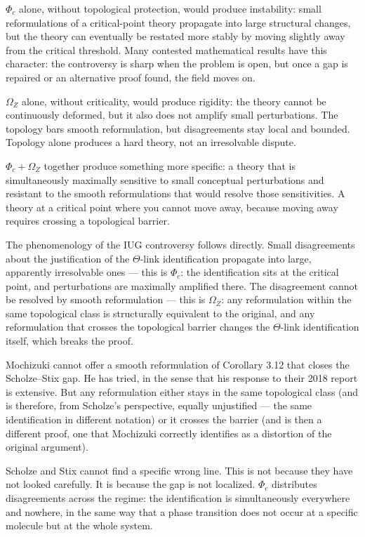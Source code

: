 \documentclass[10pt,a4paper]{article}
\begin{document}
$\Phi_c$ alone, without topological protection, would produce instability:
small reformulations of a critical-point theory propagate into large structural changes,
but the theory can eventually be restated more stably by moving slightly away from the critical
threshold.
Many contested mathematical results have this character: the controversy is sharp when the
problem is open, but once a gap is repaired or an alternative proof found, the field moves on.

$\Omega_Z$ alone, without criticality, would produce rigidity:
the theory cannot be continuously deformed, but it also does not amplify small perturbations.
The topology bars smooth reformulation, but disagreements stay local and bounded.
Topology alone produces a hard theory, not an irresolvable dispute.

$\Phi_c + \Omega_Z$ together produce something more specific:
a theory that is simultaneously maximally sensitive to small conceptual perturbations
and resistant to the smooth reformulations that would resolve those sensitivities.
A theory at a critical point where you cannot move away, because moving away requires
crossing a topological barrier.

The phenomenology of the IUG controversy follows directly.
Small disagreements about the justification of the $\Theta$-link identification propagate
into large, apparently irresolvable ones --- this is $\Phi_c$:
the identification sits at the critical point, and perturbations are maximally amplified there.
The disagreement cannot be resolved by smooth reformulation --- this is $\Omega_Z$:
any reformulation within the same topological class is structurally equivalent to the original,
and any reformulation that crosses the topological barrier changes the $\Theta$-link
identification itself, which breaks the proof.

Mochizuki cannot offer a smooth reformulation of Corollary 3.12 that closes the
Scholze--Stix gap.
He has tried, in the sense that his response to their 2018 report is extensive.
But any reformulation either stays in the same topological class (and is therefore,
from Scholze's perspective, equally unjustified --- the same identification in different
notation) or it crosses the barrier (and is then a different proof, one that Mochizuki
correctly identifies as a distortion of the original argument).

Scholze and Stix cannot find a specific wrong line.
This is not because they have not looked carefully.
It is because the gap is not localized.
$\Phi_c$ distributes disagreements across the regime: the identification is simultaneously
everywhere and nowhere, in the same way that a phase transition does not occur at a specific
molecule but at the whole system.
\end{document}
